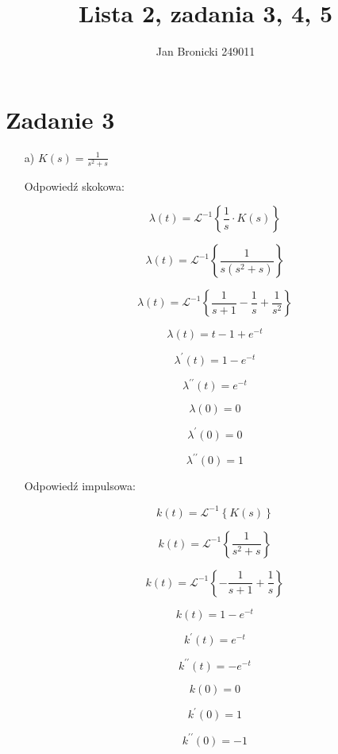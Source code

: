 \documentclass{article}
\begin{document}
\title{Lista 2, zadania 3, 4, 5}
\author{Jan Bronicki 249011}
\date{}
\maketitle

\section*{Zadanie 3}
\begin{enumerate}

    \item[a)] $K(s)=\frac{1}{s^{2} + s}$

    Odpowiedź skokowa:
    
    $$ \lambda(t)=\mathcal{L}^{-1}\left\{\frac{1}{s}\cdot K(s)\right\} $$
    
    $$ \lambda(t)=\mathcal{L}^{-1}\left\{  \frac{1}{s \left(s^{2} + s\right)} \right\}$$
    
    $$ \lambda(t)=\mathcal{L}^{-1}\left\{  \frac{1}{s + 1} - \frac{1}{s} + \frac{1}{s^{2}} \right\}$$
    
    $$ \lambda(t) = t - 1 + e^{- t} $$
    
    $$ \lambda^{\prime}(t) = 1 - e^{- t} $$
    
    $$ \lambda^{\prime\prime}(t) = e^{- t} $$
    
    $$ \lambda(0) =  0$$
    
    $$ \lambda^{\prime}(0) = 0$$
    
    $$ \lambda^{\prime\prime}(0) = 1 $$
    
    \newpage
    
    Odpowiedź impulsowa:
    
    $$ k(t)=\mathcal{L}^{-1}\left\{K(s)\right\} $$
    
    $$ k(t)=\mathcal{L}^{-1}\left\{ \frac{1}{s^{2} + s} \right\} $$
    
    $$ k(t)=\mathcal{L}^{-1}\left\{  - \frac{1}{s + 1} + \frac{1}{s}  \right\} $$
    
    $$ k(t) =  1 - e^{- t} $$
    
    $$ k^{\prime}(t) = e^{- t} $$
    
    $$ k^{\prime\prime}(t) = - e^{- t} $$
    
    $$ k(0) =  0 $$
    
    $$ k^{\prime}(0) = 1 $$
    
    $$ k^{\prime\prime}(0) = - 1 $$


    \newpage


\end{enumerate}
\end{document}
